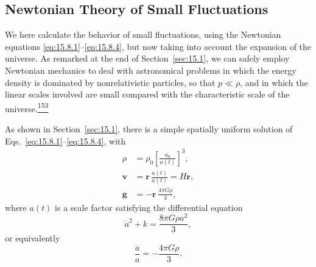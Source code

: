 
\subsection{Newtonian Theory of Small Fluctuations}\label{sec:15.9}

\begin{sloppypar}
We here calculate the behavior of small fluctuations, using the Newtonian
equations \eqref{eq:15.8.1}--\eqref{eq:15.8.4}, but now taking into account
the expansion of the universe. As remarked at the end of Section~\ref{sec:15.1},
we can safely employ Newtonian mechanics to deal with astronomical problems in
which the energy density is dominated by nonrelativistic particles, so that
\(p\ll\rho\), and in which the linear scales involved are small compared with
the characteristic scale of the
universe.\hyperref[ch15-ref-153]{\textsuperscript{153}}
\end{sloppypar}

As shown in Section~\ref{sec:15.1}, there is a simple spatially uniform
solution of Eqs.~\eqref{eq:15.8.1}--\eqref{eq:15.8.4}, with
\begin{align}
  \rho
  &=
  \rho_0\left[\frac{a_0}{a(t)}\right]^3,
  \tag{15.9.1}\label{eq:15.9.1}\\
  \mathbf v
  &=
  \mathbf r\,\frac{\dot a(t)}{a(t)}
  =H\mathbf r,
  \tag{15.9.2}\label{eq:15.9.2}\\
  \mathbf g
  &=
  -\mathbf r\,\frac{4\pi G\rho}{3},
  \tag{15.9.3}\label{eq:15.9.3}
\end{align}
where \(a(t)\) is a scale factor satisfying the differential equation
\begin{equation}
  \dot a^2+k=\frac{8\pi G\rho a^2}{3},
  \tag{15.9.4}\label{eq:15.9.4}
\end{equation}
or equivalently
\begin{equation}
  \frac{\ddot a}{a}=-\frac{4\pi G\rho}{3}.
  \tag{15.9.5}\label{eq:15.9.5}
\end{equation}

